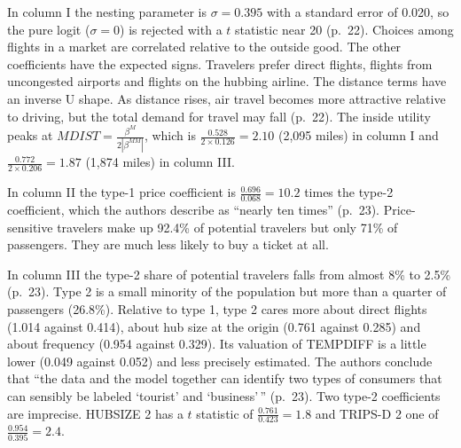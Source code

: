 In column I the nesting parameter is $\sigma=0.395$ with a standard error of 0.020, so the pure logit
($\sigma=0$) is rejected with a $t$ statistic near 20 (p.~22). Choices among flights in a market are
correlated relative to the outside good. The other coefficients have the expected signs. Travelers prefer
direct flights, flights from uncongested airports and flights on the hubbing airline. The distance terms
have an inverse U shape. As distance rises, air travel becomes more attractive relative to driving, but the
total demand for travel may fall (p.~22). The inside utility peaks at
$\mathit{MDIST}=\frac{\beta^M}{2|\beta^{MM}|}$, which is $\frac{0.528}{2\times0.126}=2.10$ (2,095 miles) in
column I and $\frac{0.772}{2\times0.206}=1.87$ (1,874 miles) in column III.

In column II the type-1 price coefficient is $\frac{0.696}{0.068}=10.2$ times the type-2 coefficient, which
the authors describe as ``nearly ten times'' (p.~23). Price-sensitive travelers make up 92.4\% of potential
travelers but only 71\% of passengers. They are much less likely to buy a ticket at all.

In column III the type-2 share of potential travelers falls from almost 8\% to 2.5\% (p.~23). Type 2 is a
small minority of the population but more than a quarter of passengers (26.8\%). Relative to type 1, type 2
cares more about direct flights (1.014 against 0.414), about hub size at the origin (0.761 against 0.285)
and about frequency (0.954 against 0.329). Its valuation of TEMPDIFF is a little lower (0.049 against 0.052)
and less precisely estimated. The authors conclude that ``the data and the model together can identify two
types of consumers that can sensibly be labeled `tourist' and `business'\,'' (p.~23). Two type-2
coefficients are imprecise. HUBSIZE 2 has a $t$ statistic of $\frac{0.761}{0.423}=1.8$ and TRIPS-D 2 one of
$\frac{0.954}{0.395}=2.4$.

